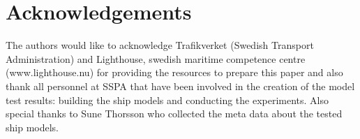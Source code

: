 \section*{Acknowledgements}
\label{se:acknowledgements}
The authors would like to acknowledge Trafikverket (Swedish Transport Administration) and Lighthouse, swedish maritime competence centre (www.lighthouse.nu) for providing the resources to prepare this paper and also thank all personnel at SSPA that have been involved in the creation of the model test results: building the ship models and conducting the experiments. Also special thanks to Sune Thorsson who collected the meta data about the tested ship models.




